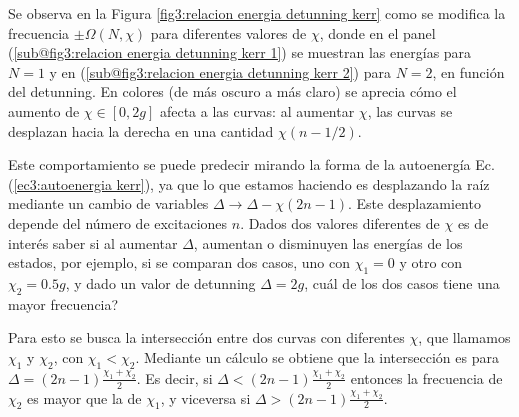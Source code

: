 Se observa en la Figura \ref{fig3:relacion energia detunning kerr} como se modifica la frecuencia $\pm \Omega(N,\chi)$ para diferentes valores de $\chi$, donde en el panel (\ref{sub@fig3:relacion energia detunning kerr 1}) se muestran las energías para $N=1$ y en (\ref{sub@fig3:relacion energia detunning kerr 2}) para $N=2$, en función del detunning. En colores (de más oscuro a más claro) se aprecia cómo el aumento de $\chi \in [0,2g]$ afecta a las curvas: al aumentar $\chi$, las curvas se desplazan hacia la derecha en una cantidad $\chi(n-1/2)$. 

Este comportamiento se puede predecir mirando la forma de la autoenergía Ec. (\ref{ec3:autoenergia kerr}), ya que lo que estamos haciendo es desplazando la raíz mediante un cambio de variables $\Delta \rightarrow \Delta - \chi(2n-1)$. Este desplazamiento depende del número de excitaciones $n$. 
Dados dos valores diferentes de $\chi$ es de interés saber si al aumentar $\Delta$, aumentan o disminuyen las energías de los estados, por ejemplo, si se comparan dos casos, uno con $\chi_1=0$ y otro con $\chi_2=0.5g$, y dado un valor de detunning $\Delta=2g$, cuál de los dos casos tiene una mayor frecuencia?

Para esto se busca la intersección entre dos curvas con diferentes $\chi$, que llamamos $\chi_1$ y $\chi_2$, con $\chi_1<\chi_2$. Mediante un cálculo se obtiene que la intersección es para $\Delta=(2n-1)\frac{\chi_1+\chi_2}{2}$. Es decir, si $\Delta<(2n-1)\frac{\chi_1+\chi_2}{2}$ entonces la frecuencia de $\chi_2$ es mayor que la de $\chi_1$, y viceversa si $\Delta>(2n-1)\frac{\chi_1+\chi_2}{2}$.

